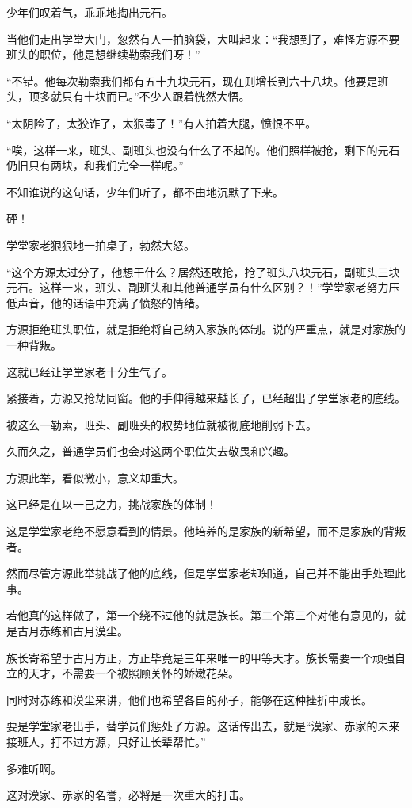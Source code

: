 \begin{this_body}
少年们叹着气，乖乖地掏出元石。

当他们走出学堂大门，忽然有人一拍脑袋，大叫起来：“我想到了，难怪方源不要班头的职位，他是想继续勒索我们呀！”

“不错。他每次勒索我们都有五十九块元石，现在则增长到六十八块。他要是班头，顶多就只有十块而已。”不少人跟着恍然大悟。

“太阴险了，太狡诈了，太狠毒了！”有人拍着大腿，愤恨不平。

“唉，这样一来，班头、副班头也没有什么了不起的。他们照样被抢，剩下的元石仍旧只有两块，和我们完全一样呢。”

不知谁说的这句话，少年们听了，都不由地沉默了下来。

砰！

学堂家老狠狠地一拍桌子，勃然大怒。

“这个方源太过分了，他想干什么？居然还敢抢，抢了班头八块元石，副班头三块元石。这样一来，班头、副班头和其他普通学员有什么区别？！”学堂家老努力压低声音，他的话语中充满了愤怒的情绪。

方源拒绝班头职位，就是拒绝将自己纳入家族的体制。说的严重点，就是对家族的一种背叛。

这就已经让学堂家老十分生气了。

紧接着，方源又抢劫同窗。他的手伸得越来越长了，已经超出了学堂家老的底线。

被这么一勒索，班头、副班头的权势地位就被彻底地削弱下去。

久而久之，普通学员们也会对这两个职位失去敬畏和兴趣。

方源此举，看似微小，意义却重大。

这已经是在以一己之力，挑战家族的体制！

这是学堂家老绝不愿意看到的情景。他培养的是家族的新希望，而不是家族的背叛者。

然而尽管方源此举挑战了他的底线，但是学堂家老却知道，自己并不能出手处理此事。

若他真的这样做了，第一个绕不过他的就是族长。第二个第三个对他有意见的，就是古月赤练和古月漠尘。

族长寄希望于古月方正，方正毕竟是三年来唯一的甲等天才。族长需要一个顽强自立的天才，不需要一个被照顾关怀的娇嫩花朵。

同时对赤练和漠尘来讲，他们也希望各自的孙子，能够在这种挫折中成长。

要是学堂家老出手，替学员们惩处了方源。这话传出去，就是“漠家、赤家的未来接班人，打不过方源，只好让长辈帮忙。”

多难听啊。

这对漠家、赤家的名誉，必将是一次重大的打击。


\end{this_body}
